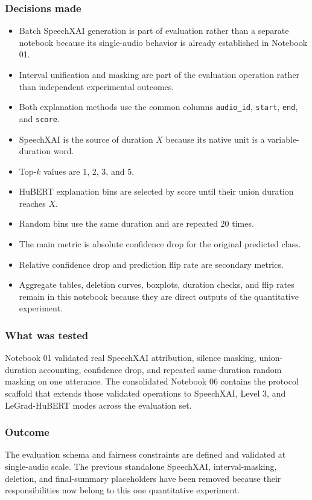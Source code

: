 \documentclass[11pt]{article}
\begin{document}
\subsubsection*{Decisions made}
\begin{itemize}
  \item Batch SpeechXAI generation is part of evaluation rather than a separate notebook because its single-audio behavior is already established in Notebook 01.
  \item Interval unification and masking are part of the evaluation operation rather than independent experimental outcomes.
  \item Both explanation methods use the common columns \texttt{audio\_id}, \texttt{start}, \texttt{end}, and \texttt{score}.
  \item SpeechXAI is the source of duration $X$ because its native unit is a variable-duration word.
  \item Top-$k$ values are $1$, $2$, $3$, and $5$.
  \item HuBERT explanation bins are selected by score until their union duration reaches $X$.
  \item Random bins use the same duration and are repeated 20 times.
  \item The main metric is absolute confidence drop for the original predicted class.
  \item Relative confidence drop and prediction flip rate are secondary metrics.
  \item Aggregate tables, deletion curves, boxplots, duration checks, and flip rates remain in this notebook because they are direct outputs of the quantitative experiment.
\end{itemize}

\subsubsection*{What was tested}
Notebook 01 validated real SpeechXAI attribution, silence masking,
union-duration accounting, confidence drop, and repeated same-duration random
masking on one utterance. The consolidated Notebook 06 contains the protocol
scaffold that extends those validated operations to SpeechXAI, Level 3, and
LeGrad-HuBERT modes across the evaluation set.

\subsubsection*{Outcome}
The evaluation schema and fairness constraints are defined and validated at single-audio scale. The previous standalone SpeechXAI, interval-masking, deletion, and final-summary placeholders have been removed because their responsibilities now belong to this one quantitative experiment.
\end{document}
